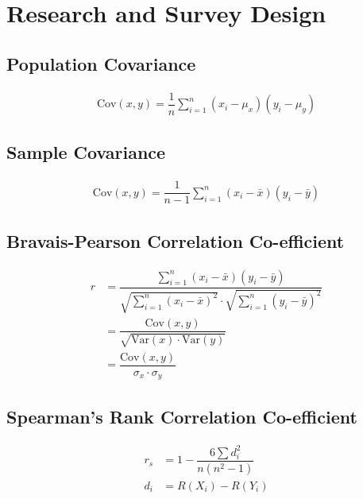 \chapter{Research and Survey Design}
\section{Population Covariance}
\begin{align}
	\text{Cov}(x,y)=\dfrac{1}{n} \sum_{i=1}^n (x_i-\mu_x)(y_i-\mu_y)
\end{align}
\section{Sample Covariance}
\begin{align}
	\text{Cov}(x,y)=\dfrac{1}{n-1} \sum_{i=1}^n (x_i-\bar{x})(y_i-\bar{y})
\end{align}
\section{Bravais-Pearson Correlation Co-efficient}
\begin{align}
	r &= \dfrac{\sum_{i=1}^n (x_i-\bar{x})(y_i-\bar{y})}{\sqrt{\sum_{i=1}^n (x_i-\bar{x})^2} \cdot \sqrt{\sum_{i=1}^n (y_i -\bar{y})^2}}\\
	& = \dfrac{\text{Cov}(x,y)}{\sqrt{\text{Var}(x) \cdot \text{Var}(y)}}\\
	& = \dfrac{\text{Cov}(x,y)}{\sigma_x \cdot \sigma_y}
\end{align}
\section{Spearman's Rank Correlation  	Co-efficient}
\begin{align}
	r_s & = 1-\dfrac{6 \sum d_i^2}{n\left(n^2-1\right)}\\
	d_i &= R(X_i) - R(Y_i)
\end{align}